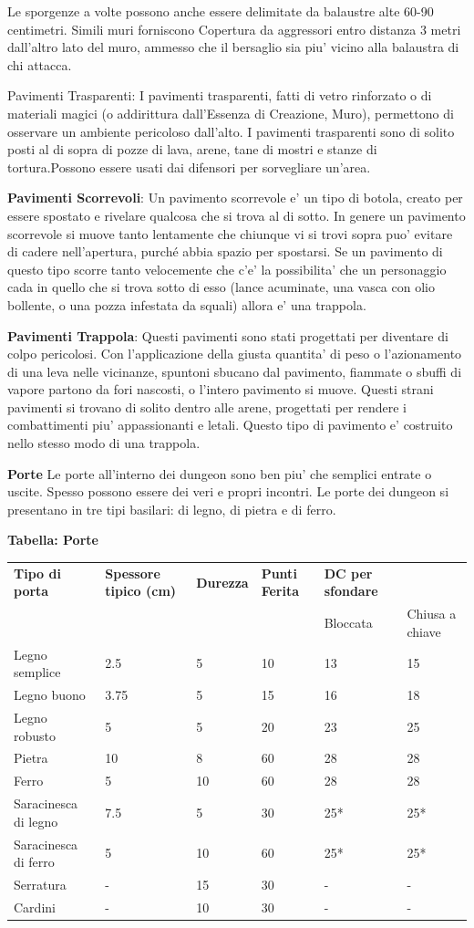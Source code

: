 \documentclass[a4paper,11pt,twoside,openany]{book}
\begin{document}
{Le sporgenze a volte possono anche essere delimitate da balaustre alte 60-90 centimetri. Simili muri forniscono Copertura da aggressori entro distanza 3 metri dall'altro lato del muro, ammesso che il bersaglio sia piu' vicino alla balaustra di chi attacca.

Pavimenti Trasparenti: I pavimenti trasparenti, fatti di vetro rinforzato o di materiali magici (o addirittura dall'Essenza di Creazione, Muro), permettono di osservare un ambiente pericoloso dall'alto. I pavimenti trasparenti sono di solito posti al di sopra di pozze di lava, arene, tane di mostri e stanze di tortura.Possono essere usati dai difensori 
per sorvegliare un'area.

\textbf{Pavimenti Scorrevoli}: Un pavimento scorrevole e' un tipo di botola, creato per essere spostato e rivelare qualcosa che si trova al di sotto. In genere un pavimento scorrevole si muove tanto lentamente che chiunque vi si trovi sopra puo' evitare di cadere nell'apertura, purché abbia spazio per spostarsi. Se un pavimento di questo tipo scorre tanto velocemente che c'e' la possibilita' che un personaggio cada in quello che si trova sotto di esso (lance acuminate, una vasca con olio bollente, o una pozza infestata da squali) allora e' una trappola.

\textbf{Pavimenti Trappola}: Questi pavimenti sono stati progettati per diventare di colpo pericolosi. Con l'applicazione della giusta quantita' di peso o l'azionamento di una leva nelle vicinanze, spuntoni sbucano dal pavimento, fiammate o sbuffi di vapore partono da fori nascosti, o l'intero pavimento si muove. Questi strani pavimenti si trovano di solito dentro alle arene, progettati per rendere i combattimenti piu' appassionanti e letali. Questo tipo di pavimento e' costruito nello stesso modo di una trappola.

\textbf{Porte} Le porte all'interno dei dungeon sono ben piu' che semplici entrate o uscite. Spesso possono essere dei veri e propri incontri. Le porte dei dungeon si presentano in tre tipi basilari: di legno, di pietra e di ferro.

\bigskip

\textbf{Tabella: Porte}

\bigskip

\begin{tabular}{L{2.5cm} L{3cm} L{2cm} L{2cm}L{2cm}L{2cm} } 
\toprule
\textbf{Tipo di porta} & \textbf{Spessore tipico (cm)} & \textbf{Durezza} & \textbf{Punti Ferita} & \textbf{DC per sfondare} & \tabularnewline
& & & & Bloccata & Chiusa a chiave\tabularnewline
Legno semplice & 2.5 & 5 & 10 & 13 & 15\tabularnewline
Legno buono & 3.75 & 5 & 15 & 16 & 18\tabularnewline
Legno robusto & 5 & 5 & 20 & 23 & 25\tabularnewline
Pietra & 10 & 8 & 60 & 28 & 28\tabularnewline
Ferro & 5 & 10 & 60 & 28 & 28\tabularnewline
Saracinesca di legno & 7.5 & 5 & 30 & 25{*} & 25{*}\tabularnewline
Saracinesca di ferro & 5 & 10 & 60 & 25{*} & 25{*}\tabularnewline
Serratura & - & 15 & 30 & - & -\tabularnewline
Cardini & - & 10 & 30 & - & -\tabularnewline
\end{tabular}

}
\end{document}
